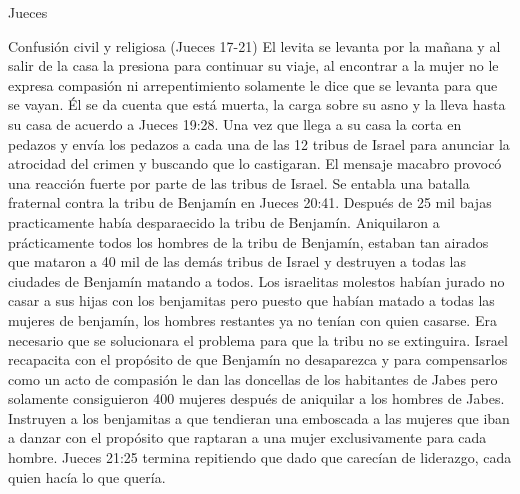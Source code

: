 \begin{section}{Jueces}
\begin{subsection}{Confusión civil y religiosa (Jueces 17-21)}
			El levita se levanta por la mañana y al salir de la casa la presiona para continuar su viaje, al encontrar a la mujer no le expresa compasión ni arrepentimiento solamente le dice que se levanta para que se vayan. Él se da cuenta que está muerta, la carga sobre su asno y la lleva hasta su casa de acuerdo a Jueces 19:28. Una vez que llega a su casa la corta en pedazos y envía los pedazos a cada una de las 12 tribus de Israel para anunciar la atrocidad del crimen y buscando que lo castigaran. El mensaje macabro provocó una  reacción fuerte por parte de las tribus de Israel. Se entabla una batalla fraternal contra la tribu de Benjamín en Jueces 20:41. Después de 25 mil bajas practicamente había desparaecido la tribu de Benjamín. Aniquilaron a prácticamente todos los hombres de la tribu de Benjamín, estaban tan airados que mataron a 40 mil de las demás tribus de Israel y destruyen a todas las ciudades de Benjamín matando a todos. Los israelitas molestos habían jurado no casar a sus hijas con los benjamitas pero puesto que habían matado a todas las mujeres de benjamín, los hombres restantes ya no tenían con quien casarse. Era necesario que se solucionara el problema para que la tribu no se extinguira. Israel recapacita con el propósito de que Benjamín no desaparezca y para compensarlos como un acto de compasión le dan las doncellas de los habitantes de Jabes pero solamente consiguieron 400 mujeres después de aniquilar a los hombres de Jabes. Instruyen a los benjamitas a que tendieran una emboscada a las mujeres que iban a danzar con el propósito que raptaran a una mujer exclusivamente para cada hombre. Jueces 21:25 termina repitiendo que dado que carecían de liderazgo, cada quien hacía lo que quería.
		\end{subsection}
	\end{section}
%


